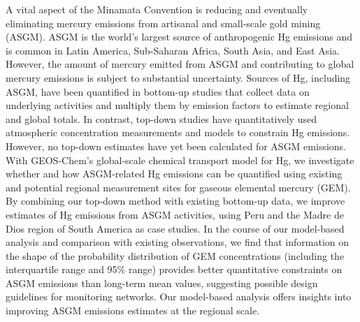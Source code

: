 % 
% 
%
A vital aspect of the Minamata Convention is reducing and eventually eliminating mercury emissions from artisanal and small-scale gold mining (ASGM). ASGM is the world's largest source of anthropogenic Hg emissions and is common in Latin America, Sub-Saharan Africa, South Asia, and East Asia. However, the amount of mercury emitted from ASGM and contributing to global mercury emissions is subject to substantial uncertainty. Sources of Hg, including ASGM, have been quantified in bottom-up studies that collect data on underlying activities and multiply them by emission factors to estimate regional and global totals. In contrast, top-down studies have quantitatively used atmospheric concentration measurements and models to constrain Hg emissions. However, no top-down estimates have yet been calculated for ASGM emissions. With GEOS-Chem's global-scale chemical transport model for Hg, we investigate whether and how ASGM-related Hg emissions can be quantified using existing and potential regional measurement sites for gaseous elemental mercury (GEM). By combining our top-down method with existing bottom-up data, we improve estimates of Hg emissions from ASGM activities, using Peru and the Madre de Dios region of South America as case studies. In the course of our model-based analysis and comparison with existing observations, we find that information on the shape of the probability distribution of GEM concentrations (including the interquartile range and 95\% range) provides better quantitative constraints on ASGM emissions than long-term mean values, suggesting possible design guidelines for monitoring networks. Our model-based analysis offers insights into improving ASGM emissions estimates at the regional scale.
